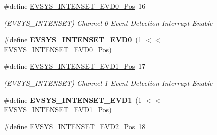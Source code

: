 \begin{DoxyCompactItemize}
\item 
\hypertarget{group___s_a_m_l21___e_v_s_y_s_gad61d449e1f09d89bd4db5373fca2cb30}{}\#define \hyperlink{group___s_a_m_l21___e_v_s_y_s_gad61d449e1f09d89bd4db5373fca2cb30}{E\+V\+S\+Y\+S\+\_\+\+I\+N\+T\+E\+N\+S\+E\+T\+\_\+\+E\+V\+D0\+\_\+\+Pos}~16\label{group___s_a_m_l21___e_v_s_y_s_gad61d449e1f09d89bd4db5373fca2cb30}

\begin{DoxyCompactList}\small\item\em (E\+V\+S\+Y\+S\+\_\+\+I\+N\+T\+E\+N\+S\+E\+T) Channel 0 Event Detection Interrupt Enable \end{DoxyCompactList}\item 
\hypertarget{group___s_a_m_l21___e_v_s_y_s_ga5a54e6d332361e7e133a7364567aa7a4}{}\#define {\bfseries E\+V\+S\+Y\+S\+\_\+\+I\+N\+T\+E\+N\+S\+E\+T\+\_\+\+E\+V\+D0}~(1 $<$$<$ \hyperlink{group___s_a_m_l21___e_v_s_y_s_gad61d449e1f09d89bd4db5373fca2cb30}{E\+V\+S\+Y\+S\+\_\+\+I\+N\+T\+E\+N\+S\+E\+T\+\_\+\+E\+V\+D0\+\_\+\+Pos})\label{group___s_a_m_l21___e_v_s_y_s_ga5a54e6d332361e7e133a7364567aa7a4}

\item 
\hypertarget{group___s_a_m_l21___e_v_s_y_s_gabaca0b14a0b1949b6acb32247e38f17a}{}\#define \hyperlink{group___s_a_m_l21___e_v_s_y_s_gabaca0b14a0b1949b6acb32247e38f17a}{E\+V\+S\+Y\+S\+\_\+\+I\+N\+T\+E\+N\+S\+E\+T\+\_\+\+E\+V\+D1\+\_\+\+Pos}~17\label{group___s_a_m_l21___e_v_s_y_s_gabaca0b14a0b1949b6acb32247e38f17a}

\begin{DoxyCompactList}\small\item\em (E\+V\+S\+Y\+S\+\_\+\+I\+N\+T\+E\+N\+S\+E\+T) Channel 1 Event Detection Interrupt Enable \end{DoxyCompactList}\item 
\hypertarget{group___s_a_m_l21___e_v_s_y_s_gabd0bc82c58d14462b12c420c5b4a16de}{}\#define {\bfseries E\+V\+S\+Y\+S\+\_\+\+I\+N\+T\+E\+N\+S\+E\+T\+\_\+\+E\+V\+D1}~(1 $<$$<$ \hyperlink{group___s_a_m_l21___e_v_s_y_s_gabaca0b14a0b1949b6acb32247e38f17a}{E\+V\+S\+Y\+S\+\_\+\+I\+N\+T\+E\+N\+S\+E\+T\+\_\+\+E\+V\+D1\+\_\+\+Pos})\label{group___s_a_m_l21___e_v_s_y_s_gabd0bc82c58d14462b12c420c5b4a16de}

\item 
\hypertarget{group___s_a_m_l21___e_v_s_y_s_ga542144111fbc105d0a6e2d704883c063}{}\#define \hyperlink{group___s_a_m_l21___e_v_s_y_s_ga542144111fbc105d0a6e2d704883c063}{E\+V\+S\+Y\+S\+\_\+\+I\+N\+T\+E\+N\+S\+E\+T\+\_\+\+E\+V\+D2\+\_\+\+Pos}~18\label{group___s_a_m_l21___e_v_s_y_s_ga542144111fbc105d0a6e2d704883c063}


\end{DoxyCompactItemize}
